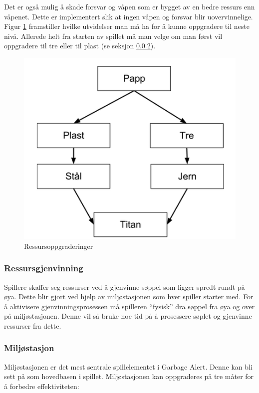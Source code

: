 Det er også mulig å skade forsvar og våpen som er bygget av en bedre ressurs enn våpenet. Dette er implementert slik at ingen våpen og forsvar blir uovervinnelige. Figur \ref{fig:ressursoppgraderinger} framstiller hvilke utvidelser man må ha for å kunne oppgradere til neste nivå. Allerede helt fra starten av spillet må man velge om man først vil oppgradere til tre eller til plast (se seksjon \ref{miljostasjon}). 

\begin{figure} [H]
	\begin{center}
	\includegraphics[scale=0.5]{images/oppgraderingstre}
	\end{center}
	\caption{Ressursoppgraderinger}
	\label{fig:ressursoppgraderinger}
\end{figure}

\subsubsection{Ressursgjenvinning}
Spillere skaffer seg ressurser ved å gjenvinne søppel som ligger spredt
rundt på øya. Dette blir gjort ved hjelp av miljøstasjonen som hver
spiller starter med. For å aktivisere gjenvinningsprosessen må spilleren
``fysisk'' dra søppel fra øya og over på miljøstasjonen. Denne vil så
bruke noe tid på å prosessere søplet og gjenvinne ressurser fra dette.


\subsubsection{Miljøstasjon} \label{miljostasjon}
Miljøstasjonen er det mest sentrale spillelementet i Garbage
Alert. Denne kan bli sett på som hovedbasen i spillet.
Miljøstasjonen kan oppgraderes på tre måter for å forbedre effektiviteten:

